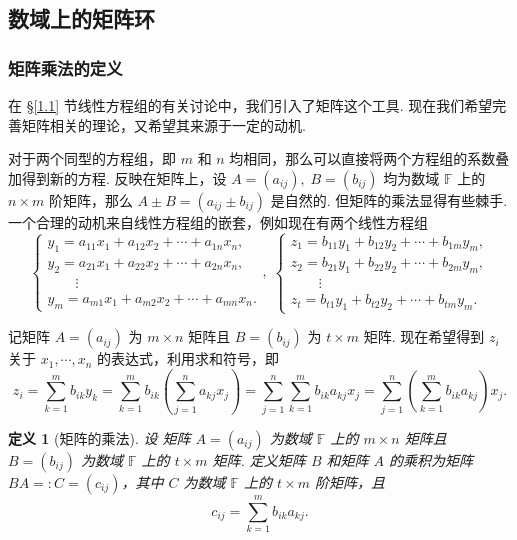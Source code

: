 \documentclass[10pt,openany]{article}
\theoremstyle{thmstyle} %
\theoremstyle{defstyle} %
\newtheorem{definition}[theorem]{定义}
\theoremstyle{prostyle} %
\theoremstyle{exastyle}
\theoremstyle{remstyle}
\newcommand{\F}{\mathbb{F}}
\begin{document}
\subsection{数域上的矩阵环}

\subsubsection{矩阵乘法的定义}

在 \S \ref{1.1} 节线性方程组的有关讨论中，我们引入了矩阵这个工具. 现在我们希望完善矩阵相关的理论，又希望其来源于一定的动机. 

对于两个同型的方程组，即 \( m \) 和 \( n \) 均相同，那么可以直接将两个方程组的系数叠加得到新的方程. 反映在矩阵上，设 \( A=(a_{ij}), \; B=(b_{ij}) \) 均为数域 \( \F \) 上的 \( n \times m \) 阶矩阵，那么 \( A \pm B=(a_{ij} \pm b_{ij}) \) 是自然的. 但矩阵的乘法显得有些棘手. 一个合理的动机来自线性方程组的嵌套，例如现在有两个线性方程组
\[ \left\{ \begin{array}{l}
	y_1= a_{11}x_1+a_{12}x_2+\cdots+a_{1n}x_n, \\
	y_2= a_{21}x_1+a_{22}x_2+\cdots+a_{2n}x_n, \\
	\qquad \vdots \\
	y_m= a_{m1}x_1+a_{m2}x_2+\cdots+a_{mn}x_n.
\end{array}\right. , \; \left\{ \begin{array}{l}
z_1= b_{11}y_1+b_{12}y_2+\cdots+b_{1m}y_m, \\
z_2= b_{21}y_1+b_{22}y_2+\cdots+b_{2m}y_m, \\
\qquad \vdots \\
z_t= b_{t1}y_1+b_{t2}y_2+\cdots+b_{tm}y_m.
\end{array}\right. \]

记矩阵 \( A=(a_{ij}) \) 为 \( m \times n \) 矩阵且 \( B=(b_{ij}) \) 为 \( t\times m \) 矩阵. 现在希望得到 \( z_i \) 关于 \( x_1,\cdots,x_n \) 的表达式，利用求和符号，即
\[ z_i=\sum_{k=1}^{m} b_{ik}y_k= \sum_{k=1}^{m} b_{ik} \left( \sum_{j=1}^{n} a_{kj} x_j \right)= \sum_{j=1}^{n} \sum_{k=1}^{m} b_{ik}a_{kj} x_j = \sum_{j=1}^{n} \left( \sum_{k=1}^{m} b_{ik}a_{kj}\right) x_j. \]

\begin{definition}[矩阵的乘法]
	设 矩阵 \( A=(a_{ij}) \) 为数域 \( \F \) 上的 \( m \times n \) 矩阵且 \( B=(b_{ij}) \) 为数域 \( \F \) 上的 \( t\times m \) 矩阵. 定义矩阵 \( B \) 和矩阵 \( A \) 的乘积为矩阵 \( BA=:C=(c_{ij}) \)，其中 \( C \) 为数域 \( \F \) 上的 \( t \times m \) 阶矩阵，且
	\[ c_{ij}=\sum_{k=1}^{m} b_{ik}a_{kj}. \] 
	\label{1.3.1}
\end{definition}
\end{document}
